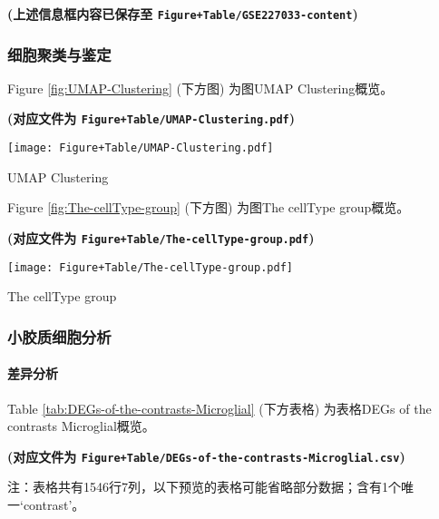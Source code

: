 \documentclass[
]{article}
\begin{document}
\textbf{(上述信息框内容已保存至 \texttt{Figure+Table/GSE227033-content})}

\hypertarget{ux7ec6ux80deux805aux7c7bux4e0eux9274ux5b9a}{%
\subsubsection{细胞聚类与鉴定}\label{ux7ec6ux80deux805aux7c7bux4e0eux9274ux5b9a}}

Figure \ref{fig:UMAP-Clustering} (下方图) 为图UMAP Clustering概览。

\textbf{(对应文件为 \texttt{Figure+Table/UMAP-Clustering.pdf})}

\def\@captype{figure}
\begin{center}
\texttt{[image: Figure+Table/UMAP-Clustering.pdf]}
\caption{UMAP Clustering}\label{fig:UMAP-Clustering}
\end{center}

Figure \ref{fig:The-cellType-group} (下方图) 为图The cellType group概览。

\textbf{(对应文件为 \texttt{Figure+Table/The-cellType-group.pdf})}

\def\@captype{figure}
\begin{center}
\texttt{[image: Figure+Table/The-cellType-group.pdf]}
\caption{The cellType group}\label{fig:The-cellType-group}
\end{center}

\hypertarget{ux5c0fux80f6ux8d28ux7ec6ux80deux5206ux6790}{%
\subsubsection{小胶质细胞分析}\label{ux5c0fux80f6ux8d28ux7ec6ux80deux5206ux6790}}

\hypertarget{ux5deeux5f02ux5206ux6790}{%
\paragraph{差异分析}\label{ux5deeux5f02ux5206ux6790}}

Table \ref{tab:DEGs-of-the-contrasts-Microglial} (下方表格) 为表格DEGs of the contrasts Microglial概览。

\textbf{(对应文件为 \texttt{Figure+Table/DEGs-of-the-contrasts-Microglial.csv})}

\begin{center}\begin{tcolorbox}[colback=gray!10, colframe=gray!50, width=0.9\linewidth, arc=1mm, boxrule=0.5pt]注：表格共有1546行7列，以下预览的表格可能省略部分数据；含有1个唯一`contrast'。
\end{tcolorbox}
\end{center}
\end{document}
